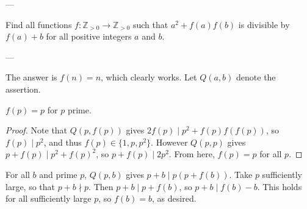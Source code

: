 
---

Find all functions $f:\mathbb Z_{>0}\to\mathbb Z_{>0}$ such that $a^2+f(a)f(b)$ is divisible by $f(a)+b$ for all positive integers $a$ and $b$.

---

The answer is $f(n)=n$, which clearly works. Let $Q(a,b)$ denote the assertion.
\begin{iclaim*}
    $f(p)=p$ for $p$ prime.
\end{iclaim*}
\begin{proof}
    Note that $Q(p,f(p))$ gives $2f(p)\mid p^2+f(p)f(f(p))$, so $f(p)\mid p^2$, and thus $f(p)\in\{1,p,p^2\}$. However $Q(p,p)$ gives $p+f(p)\mid p^2+f(p)^2$, so $p+f(p)\mid2p^2$. From here, $f(p)=p$ for all $p$.
\end{proof}

For all $b$ and prime $p$, $Q(p,b)$ gives $p+b\mid p(p+f(b))$. Take $p$ sufficiently large, so that $p+b\nmid p$. Then $p+b\mid p+f(b)$, so $p+b\mid f(b)-b$. This holds for all sufficiently large $p$, so $f(b)=b$, as desired.

